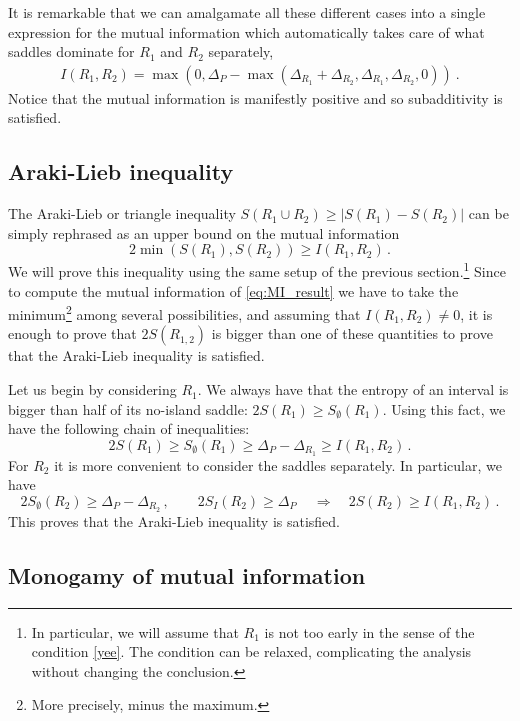 \documentclass[12pt]{article}
\newcommand{\EQ}[1]{\begin{equation}\begin{split} #1
\end{split}\end{equation}}
\begin{document}
It is remarkable that we can amalgamate all these different cases into a single expression for the mutual information which automatically takes care of what saddles dominate for $R_1$ and $R_2$ separately,
\EQ{
	I(R_1,R_2)=\max(0,\Delta_P-\max(\Delta_{R_1}+\Delta_{R_2},\Delta_{R_1},\Delta_{R_2},0))\ .
 \label{eq:MI_result}}
Notice that the mutual information is manifestly positive and so subadditivity is satisfied.

\subsection{Araki-Lieb inequality}
\label{sub:araki-lieb}

The Araki-Lieb or triangle inequality $S(R_1 \cup R_2) \ge |S(R_1)-S(R_2)|$ \cite{Araki:1970ba} can be simply rephrased as an upper bound on the mutual information
\begin{equation}
2 \min (S(R_1) , S(R_2)) \ge I(R_1,R_2) \, .
\end{equation}
We will prove this inequality using the same setup of the previous section.\footnote{In particular, we will assume that $R_1$ is not too early in the sense of the condition \eqref{yee}. The condition can be relaxed, complicating the analysis without changing the conclusion.} Since to compute the mutual information of \eqref{eq:MI_result} we have to take the minimum\footnote{More precisely, minus the maximum.} among several possibilities, and assuming that $I(R_1,R_2)\neq0$, it is enough to prove that $2 S(R_{1,2})$ is bigger than one of these quantities to prove that the Araki-Lieb inequality is satisfied.

Let us begin by considering $R_1$. We always have that the entropy of an interval is bigger than half of its no-island saddle: $2S(R_1)\geq S_\emptyset (R_1)$. Using this fact, we have the following chain of inequalities:
\begin{equation}
2S(R_1) \ge S_\emptyset (R_1) \ge \Delta_P-\Delta_{R_1} \ge I(R_1,R_2) \, .
\end{equation}
For $R_2$ it is more convenient to consider the saddles separately. In particular, we have
\begin{equation}
2S_\emptyset(R_2) \ge \Delta_P - \Delta_{R_2} \, , \qquad 2S_I(R_2) \ge \Delta_P \, \quad \Rightarrow \quad 2S(R_2)  \ge I(R_1,R_2) \, .
\end{equation}
This proves that the Araki-Lieb inequality is satisfied. \color{black}


\subsection{Monogamy of mutual information}
\label{sub:CMI}
\end{document}
